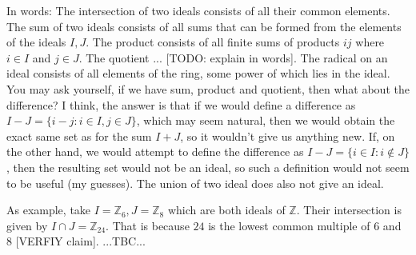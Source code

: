In words: The intersection of two ideals consists of all their common elements. The sum of two ideals consists of all sums that can be formed from the elements of the ideals $I,J$. The product consists of all finite sums of products $i j$ where $i \in I$ and $j \in J$. The quotient ... [TODO: explain in words]. The radical on an ideal consists of all elements of the ring, some power of which lies in the ideal. You may ask yourself, if we have sum, product and quotient, then what about the difference? I think, the answer is that if we would define a difference as $I - J = \{i - j : i \in I, j \in J\}$, which may seem natural, then we would obtain the exact same set as for the sum $I + J$, so it wouldn't give us anything new. If, on the other hand, we would attempt to define the difference as $I - J = \{i \in I : i \notin J\}$, then the resulting set would not be an ideal, so such a definition would not seem to be useful (my guesses). The union of two ideal does also not give an ideal.




\medskip
As example, take $I = \mathbb{Z}_6, J = \mathbb{Z}_8$ which are both ideals of $\mathbb{Z}$. Their intersection is given by $I \cap J = \mathbb{Z}_{24}$. That is because $24$ is the lowest common multiple of $6$ and $8$ [VERFIY claim]. ...TBC...

% 


